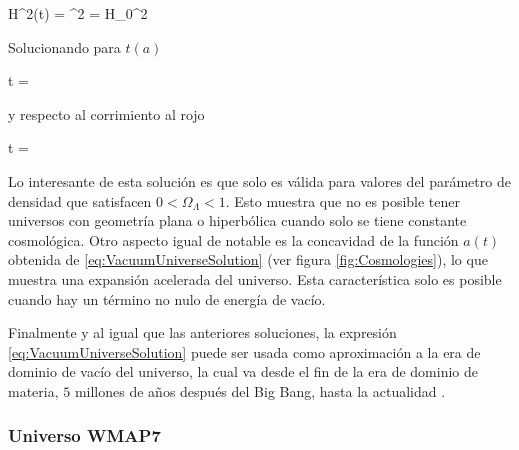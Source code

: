 { H^2(t) = ^2 = H_0^2  }


Solucionando para $t(a)$


{ t = 
\ln{} }


y respecto al corrimiento al rojo


{ t = 
\ln{} }


Lo interesante de esta solución es que solo es válida para valores del
parámetro de densidad que satisfacen $0<\Omega_\Lambda <1$. Esto muestra 
que no es posible tener universos con geometría plana o hiperbólica cuando 
solo se tiene constante cosmológica. Otro aspecto igual de notable es la 
concavidad de la función $a(t)$ obtenida de \ref{eq:VacuumUniverseSolution}
(ver figura \ref{fig:Cosmologies}), lo que muestra una expansión acelerada
del universo. Esta característica solo es posible cuando hay un término no 
nulo de energía de vacío.


Finalmente y al igual que las anteriores soluciones, la expresión 
\ref{eq:VacuumUniverseSolution} puede ser usada como aproximación a la era
de dominio de vacío del universo, la cual va desde el fin de la era de 
dominio de materia, $5$ millones de años después del 
Big Bang, hasta la actualidad \cite{longair2008}.


			\subsubsection*{Universo WMAP7}
			
